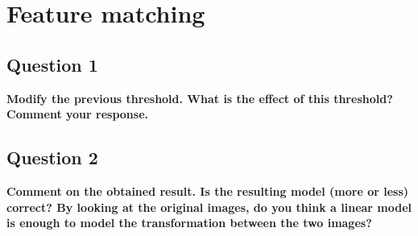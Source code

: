 \section{Feature matching}

\subsection{Question 1}

{\bfseries Modify the previous threshold. What is the effect of this
threshold? Comment your response.}

\subsection{Question 2}

{\bfseries Comment on the obtained result. Is the resulting model (more
or less) correct? By looking at the original images, do you think a linear model
is enough to model the transformation between the two images?}
